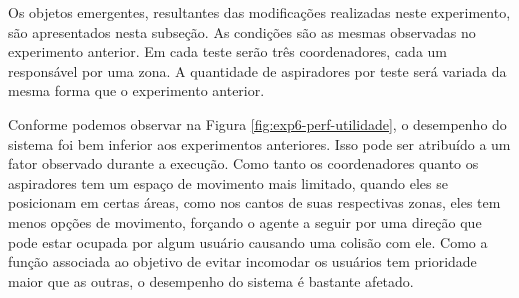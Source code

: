 Os objetos emergentes, resultantes das modificações realizadas neste experimento, são apresentados nesta subseção. As condições são as mesmas observadas no experimento anterior. Em cada teste serão três coordenadores, cada um responsável por uma zona. A quantidade de aspiradores por teste será variada da mesma forma que o experimento anterior. 

\begin{figure}[h!]
    \centering
\end{figure}

Conforme podemos observar na Figura \ref{fig:exp6-perf-utilidade}, o desempenho do sistema foi bem inferior aos experimentos anteriores. Isso pode ser atribuído a um fator observado durante a execução. Como tanto os coordenadores quanto os aspiradores tem um espaço de movimento mais limitado, quando eles se posicionam em certas áreas, como nos cantos de suas respectivas zonas, eles tem menos opções de movimento, forçando o agente a seguir por uma direção que pode estar ocupada por algum usuário causando uma colisão com ele.  Como a função associada ao objetivo de evitar incomodar os usuários tem prioridade maior que as outras, o desempenho do sistema é bastante afetado. 

\begin{figure}[h!]
    \centering
\end{figure}

